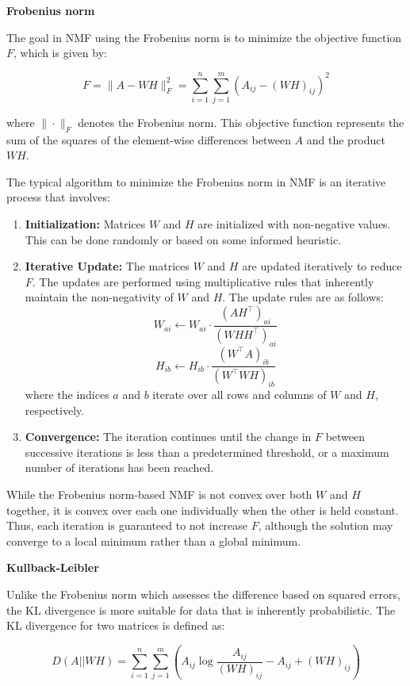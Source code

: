\documentclass{article}
\begin{document}
\textbf{Frobenius norm}

The goal in NMF using the Frobenius norm is to minimize the objective function \( F \), which is given by:

\[
F = \| A - WH \|_F^2 = \sum_{i=1}^{n} \sum_{j=1}^{m} (A_{ij} - (WH)_{ij})^2
\]

where \( \| \cdot \|_F \) denotes the Frobenius norm. This objective function represents the sum of the squares of the element-wise differences between \( A \) and the product \( WH \).

The typical algorithm to minimize the Frobenius norm in NMF is an iterative process that involves:

\begin{enumerate}
    \item \textbf{Initialization:} Matrices \( W \) and \( H \) are initialized with non-negative values. This can be done randomly or based on some informed heuristic.
    \item \textbf{Iterative Update:} The matrices \( W \) and \( H \) are updated iteratively to reduce \( F \). The updates are performed using multiplicative rules that inherently maintain the non-negativity of \( W \) and \( H \). The update rules are as follows:
    \[
    W_{ai} \leftarrow W_{ai} \cdot \frac{(AH^\top)_{ai}}{(WHH^\top)_{ai}}
    \]
    \[
    H_{ib} \leftarrow H_{ib} \cdot \frac{(W^\top A)_{ib}}{(W^\top WH)_{ib}}
    \]
    where the indices \( a \) and \( b \) iterate over all rows and columns of \( W \) and \( H \), respectively.
    \item \textbf{Convergence:} The iteration continues until the change in \( F \) between successive iterations is less than a predetermined threshold, or a maximum number of iterations has been reached.
\end{enumerate}

While the Frobenius norm-based NMF is not convex over both \( W \) and \( H \) together, it is convex over each one individually when the other is held constant. Thus, each iteration is guaranteed to not increase \( F \), although the solution may converge to a local minimum rather than a global minimum.

\textbf{Kullback-Leibler}

Unlike the Frobenius norm which assesses the difference based on squared errors, the KL divergence is more suitable for data that is inherently probabilistic. The KL divergence for two matrices is defined as:

\[
D(A || WH) = \sum_{i=1}^{n} \sum_{j=1}^{m} \left( A_{ij} \log\frac{A_{ij}}{(WH)_{ij}} - A_{ij} + (WH)_{ij} \right)
\]
\end{document}
